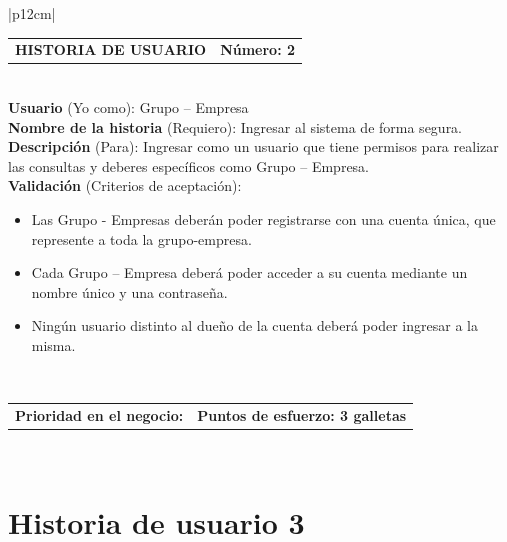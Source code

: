 \documentclass[11pt,letterpaper]{report}
\begin{document}
	\begin{center}	
	\begin{tabular}{|p{12cm}|}
		\hline
		\begin{tabular}{c|c}
			\textbf{HISTORIA DE USUARIO} & \textbf{Número: 2} \\
		\end{tabular} \\ \hline
		\textbf{Usuario} (Yo como): Grupo – Empresa \\ \hline
		\textbf{Nombre de la historia} (Requiero): Ingresar al sistema de forma segura. \\ \hline
		\textbf{Descripción} (Para): Ingresar como un usuario que tiene permisos para realizar las consultas y deberes específicos como Grupo – Empresa. \\ \hline
		\textbf{Validación} (Criterios de aceptación): \\
		\begin{minipage}{12cm}
			\begin{itemize}
				\item Las Grupo - Empresas deberán poder registrarse con una cuenta única, que represente a toda la grupo-empresa.
				\item Cada Grupo – Empresa deberá poder acceder a su cuenta mediante un nombre único y una contraseña.
				\item Ningún usuario distinto al dueño de la cuenta deberá poder ingresar a la misma.
			\end{itemize}
		\end{minipage} \\ \hline
		\begin{tabular}{p{6cm}|c}
			\textbf{Prioridad en el negocio: } & \textbf{Puntos de esfuerzo: 3 galletas } \\
		\end{tabular} \\ \hline
	\end{tabular}
	\end{center}
	
	\section{Historia de usuario 3}
	
\end{document}
